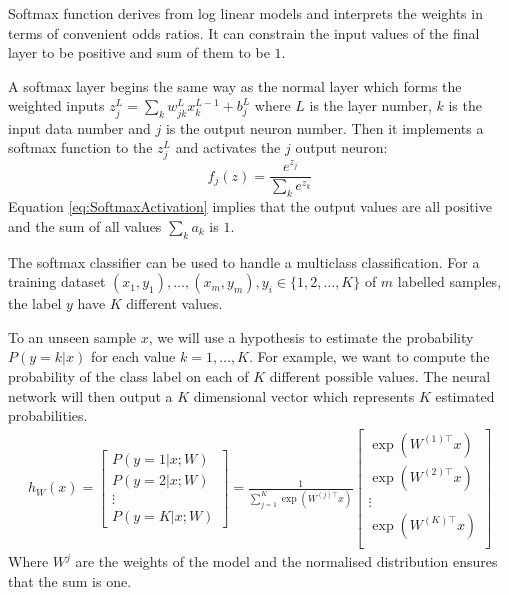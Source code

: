 Softmax function derives from log linear models and interprets the weights in terms of convenient odds ratios. It can constrain the input values of the final layer to be positive and sum of them to be $1$.

A softmax layer begins the same way as the normal layer which forms the weighted inputs $z^L_j = \sum_{k} w^L_{jk} x^{L-1}_k + b^L_j$ where $L$ is the layer number, $k$ is the input data number and $j$ is the output neuron number. Then it implements a softmax function to the $z^L_j$ and activates the $j$ output neuron:
\begin{equation}\label{eq:SoftmaxActivation}
f_j(z) = \frac{e^{z_j}}{\sum_k e^{z_k}}
\end{equation}
Equation \ref{eq:SoftmaxActivation} implies that the output values are all positive and the sum of all values $\sum_k a_k$ is $1$.

The softmax classifier can be used to handle a multiclass classification. For a training dataset $(x_{1}, y_{1}), \ldots, (x_{m}, y_{m}), y_{i} \in \{1, 2, \ldots, K\} $ of $m$ labelled samples, the label $y$ have $K$ different values.

To an unseen sample $x$, we will use a hypothesis to estimate the probability $P(y=k | x)$ for each value $k = 1, \ldots, K$. For example, we want to compute the probability of the class label on each of $K$ different possible values. The neural network will then output a $K$ dimensional vector which represents $K$ estimated probabilities. 
\begin{align}
h_{W}(x) =
\begin{bmatrix}
P(y = 1 | x; W) \\
P(y = 2 | x; W) \\
\vdots \\
P(y = K | x; W)
\end{bmatrix}
=
\frac{1}{ \sum_{j=1}^{K}{\exp(W^{(j)\top} x) }}
\begin{bmatrix}
\exp(W^{(1)\top} x ) \\
\exp(W^{(2)\top} x ) \\
\vdots \\
\exp(W^{(K)\top} x ) \\
\end{bmatrix}
\end{align}
Where $W^{j}$ are the weights of the model and the normalised distribution ensures that the sum is one.

